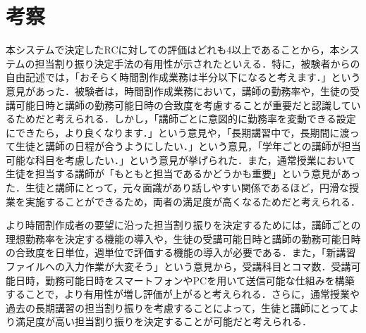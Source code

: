 \chapter{考察}
本システムで決定したRCに対しての評価はどれも4以上であることから，本システムの担当割り振り決定手法の有用性が示されたといえる．特に，被験者からの自由記述では，「おそらく時間割作成業務は半分以下になると考えます．」という意見があった．被験者は，時間割作成業務において，講師の勤務率や，生徒の受講可能日時と講師の勤務可能日時の合致度を考慮することが重要だと認識しているためだと考えられる．しかし，「講師ごとに意図的に勤務率を変動できる設定にできたら，より良くなります．」という意見や，「長期講習中で，長期間に渡って生徒と講師の日程が合うようにしたい．」という意見，「学年ごとの講師が担当可能な科目を考慮したい．」という意見が挙げられた．また，通常授業において生徒を担当する講師が「もともと担当であるかどうかも重要」という意見があった．生徒と講師にとって，元々面識があり話しやすい関係であるほど，円滑な授業を実施することができるため，両者の満足度が高くなるためだと考えられる．

より時間割作成者の要望に沿った担当割り振りを決定するためには，講師ごとの理想勤務率を決定する機能の導入や，生徒の受講可能日時と講師の勤務可能日時の合致度を日単位，週単位で評価する機能の導入が必要である．また，「新講習ファイルへの入力作業が大変そう」という意見から，受講科目とコマ数．受講可能日時，勤務可能日時をスマートフォンやPCを用いて送信可能な仕組みを構築することで，より有用性が増し評価が上がると考えられる．さらに，通常授業や過去の長期講習の担当割り振りを考慮することによって，生徒と講師にとってより満足度が高い担当割り振りを決定することが可能だと考えられる．